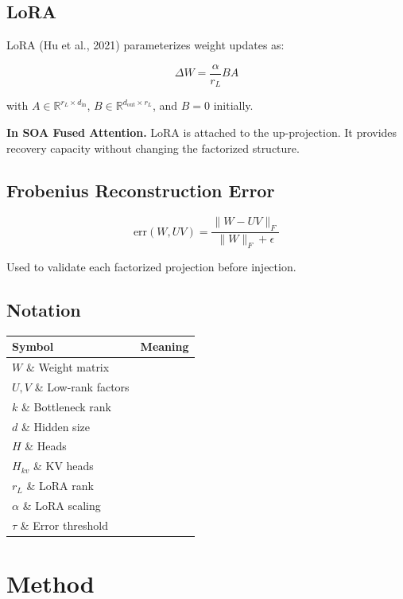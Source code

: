 \subsection{LoRA}

LoRA (Hu et al., 2021) parameterizes weight updates as:

\[
\Delta W = \frac{\alpha}{r_L} B A
\]

with $A \in \mathbb{R}^{r_L \times d_\text{in}}$, $B \in \mathbb{R}^{d_\text{out} \times r_L}$, 
and $B = 0$ initially.

\textbf{In SOA Fused Attention.} LoRA is attached to the up-projection. It 
provides recovery capacity without changing the factorized structure.

\subsection{Frobenius Reconstruction Error}

\[
\text{err}(W, UV) = \frac{\|W - UV\|_F}{\|W\|_F + \epsilon}
\]

Used to validate each factorized projection before injection.

\subsection{Notation}

\begin{table}[H]
\centering
\small
\begin{tabular}{ll}
\toprule
\textbf{Symbol} & \textbf{Meaning} \\
\midrule
$W$ \& Weight matrix \\
$U, V$ \& Low-rank factors \\
$k$ \& Bottleneck rank \\
$d$ \& Hidden size \\
$H$ \& Heads \\
$H_{kv}$ \& KV heads \\
$r_L$ \& LoRA rank \\
$\alpha$ \& LoRA scaling \\
$\tau$ \& Error threshold \\
\bottomrule
\end{tabular}
\end{table}



\section{Method}

